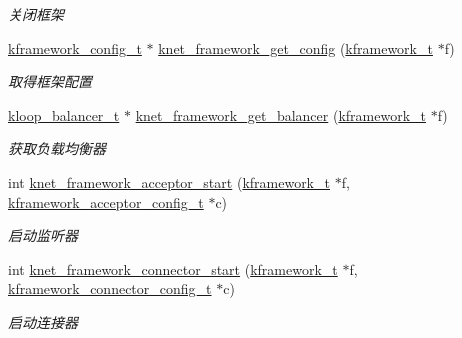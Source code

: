 \begin{DoxyCompactItemize}
\begin{DoxyCompactList}\small\item\em 关闭框架 \end{DoxyCompactList}\item 
\hyperlink{a00054_adeaf952e0f0887507ff836385bf54874_adeaf952e0f0887507ff836385bf54874}{kframework\+\_\+config\+\_\+t} $\ast$ \hyperlink{a00110_ga2fcd8c172557a78fe7edbba0e7f9da40_ga2fcd8c172557a78fe7edbba0e7f9da40}{knet\+\_\+framework\+\_\+get\+\_\+config} (\hyperlink{a00054_a3195a3be35782fc1efb920c811be111d_a3195a3be35782fc1efb920c811be111d}{kframework\+\_\+t} $\ast$f)
\begin{DoxyCompactList}\small\item\em 取得框架配置 \end{DoxyCompactList}\item 
\hyperlink{a00054_abd3f964265beb2f8984e76f44fb5ea33_abd3f964265beb2f8984e76f44fb5ea33}{kloop\+\_\+balancer\+\_\+t} $\ast$ \hyperlink{a00055_a5bda21127c93214014579d21f6efd643_a5bda21127c93214014579d21f6efd643}{knet\+\_\+framework\+\_\+get\+\_\+balancer} (\hyperlink{a00054_a3195a3be35782fc1efb920c811be111d_a3195a3be35782fc1efb920c811be111d}{kframework\+\_\+t} $\ast$f)
\begin{DoxyCompactList}\small\item\em 获取负载均衡器 \end{DoxyCompactList}\item 
int \hyperlink{a00110_gae3f68614153df18fabd1c7d148ce826b_gae3f68614153df18fabd1c7d148ce826b}{knet\+\_\+framework\+\_\+acceptor\+\_\+start} (\hyperlink{a00054_a3195a3be35782fc1efb920c811be111d_a3195a3be35782fc1efb920c811be111d}{kframework\+\_\+t} $\ast$f, \hyperlink{a00054_a39c993eb450173e4fde04498d757f9b6_a39c993eb450173e4fde04498d757f9b6}{kframework\+\_\+acceptor\+\_\+config\+\_\+t} $\ast$c)
\begin{DoxyCompactList}\small\item\em 启动监听器 \end{DoxyCompactList}\item 
int \hyperlink{a00110_ga28cdba2072f2c191547c0450d040d536_ga28cdba2072f2c191547c0450d040d536}{knet\+\_\+framework\+\_\+connector\+\_\+start} (\hyperlink{a00054_a3195a3be35782fc1efb920c811be111d_a3195a3be35782fc1efb920c811be111d}{kframework\+\_\+t} $\ast$f, \hyperlink{a00054_a44d3033eba5a4fd784a741700a7a2521_a44d3033eba5a4fd784a741700a7a2521}{kframework\+\_\+connector\+\_\+config\+\_\+t} $\ast$c)
\begin{DoxyCompactList}\small\item\em 启动连接器 \end{DoxyCompactList}\item 

\end{DoxyCompactItemize}
